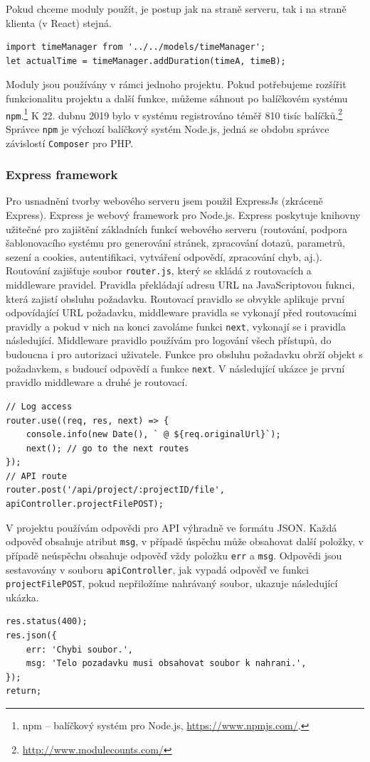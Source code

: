 Pokud chceme moduly použít, je postup jak na straně serveru, tak i na straně klienta (v React) stejná.
\begin{lstlisting}[style=JavaScript]
import timeManager from '../../models/timeManager';
let actualTime = timeManager.addDuration(timeA, timeB);
\end{lstlisting}

Moduly jsou používány v rámci jednoho projektu. Pokud potřebujeme rozšířit funkcionalitu projektu a další funkce, můžeme sáhnout po balíčkovém systému \texttt{npm}.\footnote{npm -- balíčkový systém pro Node.js, \url{https://www.npmjs.com/}.} K 22. dubnu 2019 bylo v systému registrováno téměř 810 tisíc balíčků.\footnote{\url{http://www.modulecounts.com/}} Správce \texttt{npm} je výchozí balíčkový systém Node.js, jedná se obdobu správce závislostí \texttt{Composer} pro PHP.

\subsubsection{Express framework}
Pro usnadnění tvorby webového serveru jsem použil ExpressJs (zkráceně Express). Express je webový framework pro Node.js. Express poskytuje knihovny užitečné pro zajištění základních funkcí webového serveru (routování, podpora šablonovacího systému pro generování stránek, zpracování dotazů, parametrů, sezení a cookies, autentifikaci, vytváření odpovědí, zpracování chyb, aj.). Routování zajišťuje soubor \texttt{router.js}, který se skládá z routovacích a middleware pravidel. Pravidla překládají adresu URL na JavaScriptovou fuknci, která zajistí obsluhu požadavku. Routovací pravidlo se obvykle aplikuje první odpovídající URL požadavku, middleware pravidla se vykonají před routovacími pravidly a pokud v nich na konci zavoláme funkci \texttt{next}, vykonají se i pravidla následující. Middleware pravidlo používám pro logování všech přístupů, do budoucna i pro autorizaci uživatele. Funkce pro obsluhu požadavku obrží objekt s požadavkem, s budoucí odpovědí a funkce \texttt{next}. V následující ukázce je první pravidlo middleware a druhé je routovací.
\begin{lstlisting}[style=JavaScript]
// Log access
router.use((req, res, next) => {
    console.info(new Date(), ` @ ${req.originalUrl}`);
    next(); // go to the next routes
});
// API route
router.post('/api/project/:projectID/file', apiController.projectFilePOST);
\end{lstlisting}

V projektu používám odpovědi pro API výhradně ve formátu JSON. Každá odpověď obsahuje atribut \texttt{msg}, v případě úspěchu může obsahovat další položky, v případě neúspěchu obsahuje odpověď vždy položku \texttt{err} a \texttt{msg}. Odpovědi jsou sestavovány v souboru \texttt{apiController}, jak vypadá odpověď ve funkci \texttt{projectFilePOST}, pokud nepřiložíme nahrávaný soubor, ukazuje následující ukázka.
\begin{lstlisting}[style=JavaScript]
res.status(400);
res.json({
    err: 'Chybi soubor.',
    msg: 'Telo pozadavku musi obsahovat soubor k nahrani.',
});
return;
\end{lstlisting}

